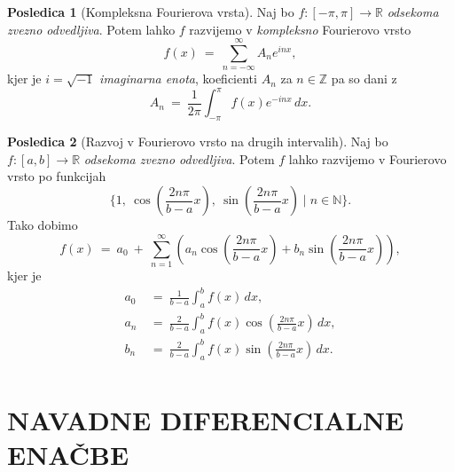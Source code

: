 \documentclass[11pt]{article}
\theoremstyle{definition}
\theoremstyle{definition}
\theoremstyle{definition}
\theoremstyle{theorem}
\newtheorem*{posledica}{Posledica}
\begin{document}
\begin{posledica}[Kompleksna Fourierova vrsta]

Naj bo $f:[-\pi, \pi] \rightarrow \mathbb{R}$ \textit{\hbox{odsekoma} zvezno odvedljiva}. Potem lahko $f$ razvijemo v \textit{kompleksno} Fourierovo vrsto
$$f(x) ~=~ \sum_{n=-\infty}^{\infty} A_n e^{inx},$$
kjer je $i = \sqrt{-1}$ \textit{imaginarna enota}, koeficienti $A_n$ za $n \in \mathbb{Z}$ pa so dani z
$$A_n ~=~ \frac{1}{2\pi} \int_{-\pi}^{\pi} f(x) e^{-inx}\,dx.$$

\end{posledica}
\vspace{0.5cm}

\begin{posledica}[Razvoj v Fourierovo vrsto na drugih intervalih]

Naj bo \hbox{$f:[a, b] \rightarrow \mathbb{R}$} \textit{odsekoma zvezno odvedljiva}. Potem $f$ lahko razvijemo v Fourierovo vrsto po funkcijah
$$\{ 1, ~\cos \left( \frac{2n\pi}{b-a}x \right), ~\sin \left( \frac{2n\pi}{b-a}x \right) \mid n \in \mathbb{N} \}.$$
Tako dobimo
$$f(x) ~=~ a_0 ~+~ \sum_{n=1}^{\infty} \left( a_n \cos \left( \frac{2n\pi}{b-a}x \right) + b_n \sin \left( \frac{2n\pi}{b-a}x \right) \right),$$
kjer je 
\begin{align*}
a_0 ~&=~ \frac{1}{b-a} \int_{a}^{b} f(x)\,dx, \\
a_n ~&=~ \frac{2}{b-a} \int_{a}^{b} f(x) \cos \left( \frac{2n\pi}{b-a}x \right)\,dx, \\
b_n ~&=~ \frac{2}{b-a} \int_{a}^{b} f(x) \sin \left( \frac{2n\pi}{b-a}x \right)\,dx. \\
\end{align*}

\end{posledica}
\vspace{0.5cm}


\pagebreak


\section{NAVADNE DIFERENCIALNE ENAČBE}
\vspace{0.5cm}

\end{document}
